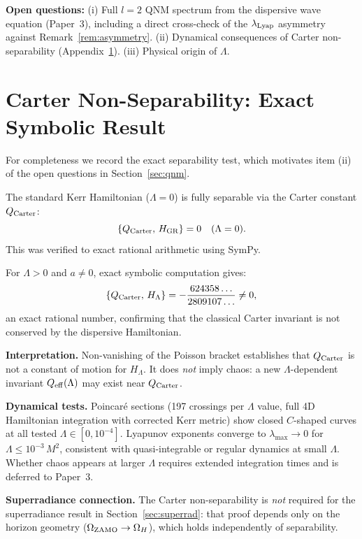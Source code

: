 \documentclass[12pt,a4paper]{article}
\newcommand{\lLyap}{\lambda_{\rm Lyap}}
\begin{document}
\textbf{Open questions:}
(i) Full $l=2$ QNM spectrum from the dispersive wave equation (Paper~3),
including a direct cross-check of the $\lLyap$ asymmetry against
Remark~\ref{rem:asymmetry}.
(ii) Dynamical consequences of Carter non-separability (Appendix~\ref{app:carter}).
(iii) Physical origin of $\Lambda$.

\appendix

\section{Carter Non-Separability: Exact Symbolic Result}
\label{app:carter}

For completeness we record the exact separability test, which motivates
item (ii) of the open questions in Section~\ref{sec:qnm}.

The standard Kerr Hamiltonian ($\Lambda=0$) is fully separable via the
Carter constant $Q_{\rm Carter}$:
\begin{equation}
  \{Q_{\rm Carter},\, H_{\rm GR}\} = 0 \quad (\Lambda = 0).
\end{equation}
This was verified to exact rational arithmetic using SymPy.

For $\Lambda>0$ and $a\neq 0$, exact symbolic computation gives:
\begin{equation}
  \{Q_{\rm Carter},\, H_\Lambda\}
  = -\frac{624358\ldots}{2809107\ldots} \neq 0,
\end{equation}
an exact rational number, confirming that the classical Carter invariant
is not conserved by the dispersive Hamiltonian.

\textbf{Interpretation.}
Non-vanishing of the Poisson bracket establishes that $Q_{\rm Carter}$
is not a constant of motion for $H_\Lambda$. It does \emph{not}
imply chaos: a new $\Lambda$-dependent invariant $Q_{\rm eff}(\Lambda)$
may exist near $Q_{\rm Carter}$.

\textbf{Dynamical tests.}
Poincar\'e sections (197 crossings per $\Lambda$ value, full 4D
Hamiltonian integration with corrected Kerr metric)
show closed $C$-shaped curves at all tested $\Lambda\in[0,10^{-4}]$.
Lyapunov exponents converge to $\lambda_{\max}\to 0$ for
$\Lambda\leq 10^{-3}\,M^2$, consistent with quasi-integrable or
regular dynamics at small $\Lambda$. Whether chaos appears at larger
$\Lambda$ requires extended integration times and is deferred to
Paper~3.

\textbf{Superradiance connection.}
The Carter non-separability is \emph{not} required for the
superradiance result in Section~\ref{sec:superrad}: that proof depends
only on the horizon geometry ($\Omega_{\rm ZAMO}\to\Omega_H$), which
holds independently of separability.
\end{document}

